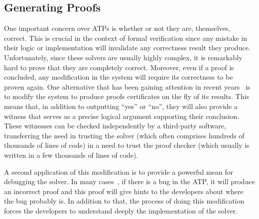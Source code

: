 \documentclass[a4paper, 12pt]{article}
\begin{document}
\subsection{Generating Proofs}
One important concern over ATPs is whether or not they are, themselves, correct. This is crucial
in the context of formal verification since any mistake in their logic or implementation will invalidate any
correctness result they produce. Unfortunately, since these solvers are usually highly complex,
it is remarkably hard to prove that they are completely correct. Moreover, even if a proof is concluded,
any modification in the system will require its correctness to be proven again. One alternative that has been
gaining attention in recent years~\cite{generatingProofs, proofsInSmt} is to modify the system to produce
proofs certificates on the fly of its results. This means that, in addition to outputting ``yes'' or ``no'', they will
also provide a witness that serves as a precise logical argument supporting their conclusion. These witnesses can be
checked independently by a third-party software, transferring the need in trusting the solver (which often
comprises hundreds of thousands of lines of code) in a need to trust the proof checker (which usually is
written in a few thousands of lines of code).

A second application of this modification is to provide a powerful mean for debugging the solver.
In many cases~\cite{generatingProofs}, if there is a bug in the ATP, it will produce an incorrect
proof and this proof will give hints to the developers about where the bug probably is.
In addition to that, the process of doing this modification forces
the developers to understand deeply the implementation of the solver.
\end{document}
